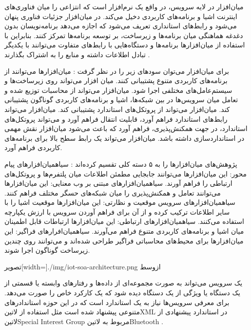 میان‌افزار در لایه سرویس، در واقع یک نرم‌افزار است که انتزاعی را میان فناوری‌های اینترنت اشیا و برنامه‌های کاربردی دخیل می‌کند.
در میان‌افزار جزئیات فناوری پنهان می‌شود و رابط‌های استانداری تعریف می‌شود که اجازه می‌دهد برنامه‌نویسان بدون دغدغه هماهنگی میان برنامه‌ها و زیرساخت، بر توسعه برنامه‌ها تمرکز کنند.
بنابراین با استفاده از میان‌افزارها برنامه‌ها و دستگاه‌هایی با رابط‌های متفاوت می‌توانند با یکدیگر تبادل اطلاعات داشته و منابع را به اشتراک بگذارند
.

برای میان‌افزار می‌توان سودهای زیر را در نظر گرفت
:
 میان‌افزارها می‌توانند از برنامه‌های کاربردی متنوع پشتیبانی کنند.
 میان افزار می‌تواند روی زیرساخت‌ها و سیستم‌عامل‌های مختلفی اجرا شود.
 میان‌افزار می‌تواند از محاسبات توزیع شده و تعامل میان سرویس‌ها در بین شبکه‌ها، اشیا و برنامه‌های کاربردی گوناگون پشتیبانی کند.
 میان‌افزار می‌تواند از پروتکل‌های استاندارد پشتیبانی کند.
 میان‌افزار می‌تواند رابط‌های استاندارد فراهم آورد، قابلیت انتقال فراهم آورد و می‌تواند پروتکل‌های استاندارد، در جهت همکنش‌پذیری، فراهم آورد که باعث می‌شود میان‌افزار نقش مهمی در استانداردسازی داشته باشد.
 میان‌افزار می‌تواند یک رابط سطح بالا برای برنامه‌های کاربردی فراهم آورد.

پژوهش‌های میان‌افزارها را به ۵ دسته کلی تقسیم کرده‌اند
:
 ‌سیاه{میان‌افزارهای پیام محور}: این میان‌افزارها می‌توانند جابجایی مطمئن اطلاعات میان پلتفرم‌ها و پروتکل‌های ارتباطی را فراهم آورند.
 ‌سیاه{میان‌افزارهای مبتنی بر وب معنایی}: این میان‌افزارها می‌توانند تعامل و همکنش‌پذیری را میان شبکه‌های حسگر مختلف فراهم کنند.
 ‌سیاه{میان‌افزارهای سرویس موقعیت و نظارتی}: این میان‌افزارها موقعیت اشیا را با سایر اطلاعات ترکیب کرده و از آن برای فراهم آوردن سرویس با ارزش یکپارچه استفاده می‌کنند.
 ‌سیاه{میان‌افزارهای ارتباطی}: این میان‌افزارها ارتباطات قابل اطمینان میان اشیا و برنامه‌های کاربردی متنوع فراهم می‌آورند.
 ‌سیاه{میان‌افرارهای فراگیر}: این میان‌افزارها برای محیط‌های محاسباتی فراگیر طراحی شده‌اند و می‌توانند روی چندین زیرساخت گوناگون اجرا شوند.

‌تصویر[width=\textwidth]{./img/iot-soa-architecture.png}
‌ازوسط

یک سرویس می‌تواند به صورت مجموعه‌ای از داده‌ها و رفتارهای وابسته یا قسمتی از یک دستگاه یا ویژگی از یک دستگاه دیده شود که یک کارکرد خاص را صورت می‌دهد.
برای معرفی سرویس‌ها نیاز به یک استاندارد است که در این حوزه استاندادرهای متنوعی پیشنهاد شده است
مثل استفاده از ‌لاتین{XML} در استاندارد پیشنهادی از ‌لاتین{Special Interest Group} مربوط به ‌لاتین{Bluetooth}
.

